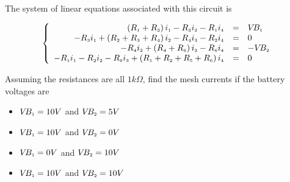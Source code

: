 \documentclass{ximera}
\begin{document}
\begin{ex}
The system of linear equations associated with this circuit is

\[ \left\{ \begin{array}{rcl} \left(R_{\mbox{\tiny$1$}} + R_{\mbox{\tiny$3$}}\right)i_{\mbox{\tiny$1$}} - R_{\mbox{\tiny$3$}}i_{\mbox{\tiny$2$}} - R_{\mbox{\tiny$1$}}i_{\mbox{\tiny$4$}} & = & V\!B_{\mbox{\tiny$1$}} \\
-R_{\mbox{\tiny$3$}}i_{\mbox{\tiny$1$}} + \left(R_{\mbox{\tiny$2$}} + R_{\mbox{\tiny$3$}} + R_{\mbox{\tiny$4$}}\right)i_{\mbox{\tiny$2$}} - R_{\mbox{\tiny$4$}}i_{\mbox{\tiny$3$}} - R_{\mbox{\tiny$2$}}i_{\mbox{\tiny$4$}} & = & 0 \\
-R_{\mbox{\tiny$4$}}i_{\mbox{\tiny$2$}} + \left(R_{\mbox{\tiny$4$}} + R_{\mbox{\tiny$6$}}\right)i_{\mbox{\tiny$3$}} - R_{\mbox{\tiny$6$}}i_{\mbox{\tiny$4$}} & = & -V\!B_{\mbox{\tiny$2$}} \\
-R_{\mbox{\tiny$1$}}i_{\mbox{\tiny$1$}} - R_{\mbox{\tiny$2$}}i_{\mbox{\tiny$2$}} - R_{\mbox{\tiny$6$}}i_{\mbox{\tiny$3$}} + \left(R_{\mbox{\tiny$1$}} + R_{\mbox{\tiny$2$}} + R_{\mbox{\tiny$5$}} + R_{\mbox{\tiny$6$}}\right)i_{\mbox{\tiny$4$}} & = & 0 \\  \end{array} \right.\]

Assuming the resistances are all $1 k\Omega$, find the mesh currents if the battery voltages are

\begin{multicols}{2}

\begin{itemize}

\item  $V\!B_{\mbox{\tiny$1$}} = 10 V$ and $V\!B_{\mbox{\tiny$2$}} = 5 V$

\item  $V\!B_{\mbox{\tiny$1$}} = 10 V$ and $V\!B_{\mbox{\tiny$2$}} = 0 V$

\end{itemize}

\end{multicols}

\begin{multicols}{2}

\begin{itemize}

\item  $V\!B_{\mbox{\tiny$1$}} = 0 V$ and $V\!B_{\mbox{\tiny$2$}} = 10 V$

\item  $V\!B_{\mbox{\tiny$1$}} = 10 V$ and $V\!B_{\mbox{\tiny$2$}} = 10 V$


\end{itemize}
\end{multicols}
\end{ex}
\end{document}
